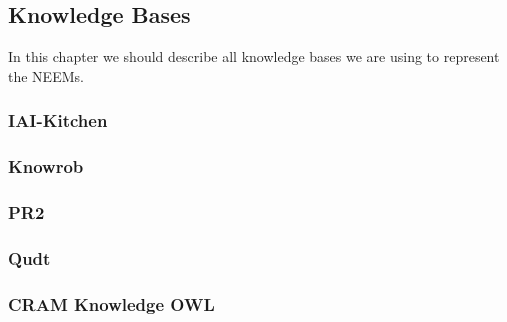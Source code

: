 \subsection{Knowledge Bases}

In this chapter we should describe all knowledge bases we are using to represent the NEEMs.

\subsubsection{IAI-Kitchen}
\subsubsection{Knowrob}
\subsubsection{PR2}
\subsubsection{Qudt}
\subsubsection{CRAM Knowledge OWL}
